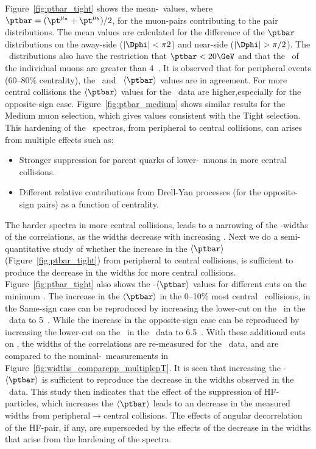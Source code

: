 Figure~\ref{fig:ptbar_tight} shows the mean-\ptbar\ values, 
  where $\ptbar=(\pt^{\mu_a}+\pt^{\mu_b})/2$,
  for the muon-pairs contributing to the pair distributions.
The mean values are calculated for the difference of the $\ptbar$
  distributions on the away-side ($|\Dphi|<\pi2$)
  and near-side ($|\Dphi|>\pi/2$).
The \ptbar\ distributions also
  have the restriction that $\ptbar<20\GeV$ and that
  the \pt\ of the individual muons are greater than 4~\GeV.
It is observed that for peripheral events (60--80\% centrality),
  the \pp\ and \PbPb\ $\langle\ptbar\rangle$ values are in agreement.
For more central collisions the $\langle\ptbar\rangle$ values
  for the \PbPb\ data are higher,especially for the opposite-sign case.
Figure~\ref{fig:ptbar_medium} shows similar results for
  the Medium muon selection, which gives values consistent 
  with the Tight selection.
This hardening of the \ptbar\ spectras, from peripheral
  to central collisions, can arises from multiple effects 
  such as:
\begin{itemize}
  \item Stronger suppression for parent quarks of lower-\pt\ muons
      in more central collisions.
  \item Different relative contributions from Drell-Yan processes 
    (for the opposite-sign pairs) as a function of centrality.
\end{itemize}
The harder spectra in more central collisions, leads
  to a narrowing of the \Dphi-widths of the correlations,
  as the widths decrease with increasing \pt.
Next we do a semi-quantitative study of whether the increase 
  in the $\langle\ptbar\rangle$ (Figure~\ref{fig:ptbar_tight}) 
  from peripheral to central collisions, is sufficient to produce
  the decrease in the widths for more central collisions.
Figure~\ref{fig:ptbar_tight} also shows the 
  \pp-$\langle\ptbar\rangle$ values for different cuts 
  on the minimum \ptbar.
The increase in the $\langle\ptbar\rangle$ 
  in the 0--10\% most central \PbPb\ collisions, 
  in the Same-sign case can be reproduced by increasing 
  the lower-cut on the \ptbar\ in the \pp\ data to 5~\GeV.
While the increase in the opposite-sign case can be reproduced
  by increasing the lower-cut on the \ptbar\ in the \pp\ data
  to 6.5~\GeV.
With these additional cuts on \ptbar, the widths of the correlations
  are re-measured for the \pp\ data, and are compared to the nominal-\PbPb\
  measurements in Figure~\ref{fig:widths_comparepp_multiplepT}.
It is seen that increasing the \pp-$\langle\ptbar\rangle$
  is sufficient to reproduce the decrease in the widths
  observed in the \PbPb\ data.
This study then indicates that the effect of the suppression 
  of HF-particles, which increases the $\langle\ptbar\rangle$
  leads to an decrease in the measured widths from 
  peripheral$\rightarrow$central collisions.
The effects of angular decorrelation of the HF-pair, if any,
  are supersceded by the effects of the decrease in the
  widths that arise from the hardening of the spectra.
  


